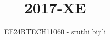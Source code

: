 \documentclass[journal]{IEEEtran}
\begin{document}

\vspace{3cm}

\title{2017-XE}
\author{EE24BTECH11060 - sruthi bijili}
{\let\newpage\relax\maketitle}

\renewcommand{\thefigure}{\theenumi}
\renewcommand{\thetable}{\theenumi}
\setlength{\intextsep}{10pt} %


\renewcommand{\thetable}{\theenumi}
\end{document}
